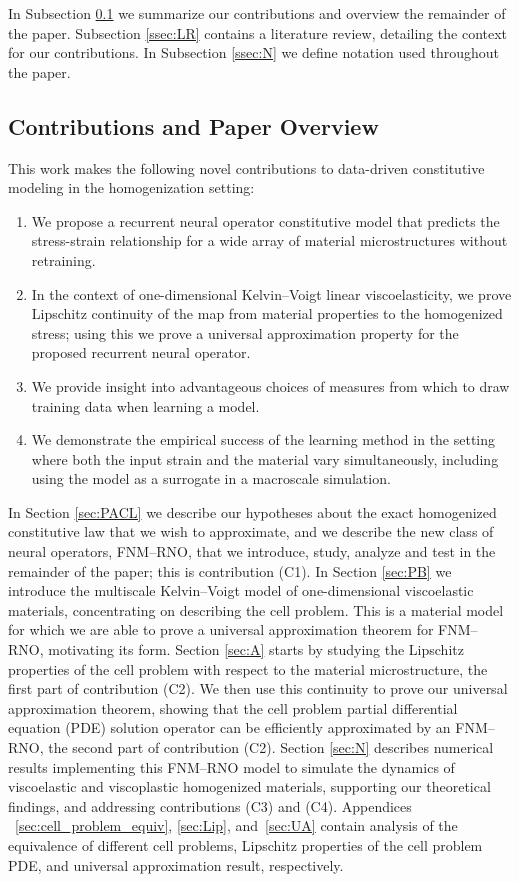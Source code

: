 \documentclass[letterpaper,11pt]{article}
\begin{document}
In Subsection \ref{ssec:CPO} we summarize our contributions and overview the remainder of the paper.
Subsection \ref{ssec:LR} contains a literature review, detailing the context for our contributions. In Subsection \ref{ssec:N} we define notation used throughout the paper.

\subsection{Contributions and Paper Overview}
\label{ssec:CPO}
This work makes the following novel contributions to data-driven constitutive modeling in the homogenization setting:
\begin{enumerate}[label=(C\arabic*)]
    \item  We propose a recurrent neural operator constitutive model that predicts the stress-strain relationship for a wide array of material microstructures without retraining.
    \item In the context of one-dimensional Kelvin--Voigt linear viscoelasticity, we prove Lipschitz continuity of the map from material properties to the homogenized stress; using this we prove a universal approximation property for the proposed recurrent neural operator.
    \item We provide insight into advantageous choices of measures from which to draw training data when learning a model.
    \item We demonstrate the empirical success of the learning method in the setting where both the input strain and the material vary simultaneously, including using the model as a surrogate in a macroscale simulation.
\end{enumerate}


In Section \ref{sec:PACL} we describe our hypotheses about the exact homogenized constitutive law that
we wish to approximate, and we describe the new class of neural operators, FNM--RNO, that we introduce, study,
analyze and test in the remainder of the paper; this is contribution (C1). In Section \ref{sec:PB} we introduce the multiscale Kelvin--Voigt model
of one-dimensional viscoelastic materials, concentrating on describing the cell problem.
This is a material model for which we are able to prove a universal
approximation theorem for FNM--RNO, motivating its form. Section \ref{sec:A} starts by studying the Lipschitz properties of the cell problem with respect to the material microstructure, the first part of contribution (C2). We then use this continuity to prove our universal approximation theorem, showing that the cell problem partial differential equation (PDE) solution operator can be efficiently approximated by an FNM--RNO,
the second part of contribution (C2). Section \ref{sec:N} describes numerical results implementing this FNM--RNO model to simulate the dynamics of viscoelastic and viscoplastic homogenized materials, supporting our theoretical findings, and addressing contributions (C3) and (C4). Appendices ~\ref{sec:cell_problem_equiv}, \ref{sec:Lip}, and~\ref{sec:UA} contain analysis of the equivalence of different cell problems, Lipschitz properties of the cell problem PDE, and universal approximation result, respectively.
\end{document}
